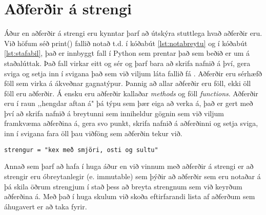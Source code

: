 \section{Aðferðir á strengi}
Áður en aðferðir á strengi eru kynntar þarf að útskýra stuttlega hvað aðferðir eru.
Við höfum séð print() fallið notað t.d. í kóðabút \ref{lst:notabreytu} og í kóðabút \ref{lst:stafabil}, það er innbyggt fall í Python sem prentar það sem beðið er um á staðalúttak. 
Það fall virkar eitt og sér og þarf bara að skrifa nafnið á því, gera sviga og setja inn í svigana það sem við viljum láta fallið fá .
Aðferðir eru sérhæfð föll sem virka á ákveðnar gagnatýpur.
Þannig að allar aðferðir eru föll, ekki öll föll eru aðferðir.
Á ensku eru aðferðir kallaðar \textit{methods} og föll \textit{functions}.
Aðferðir eru í raun ,,hengdar aftan á" þá týpu sem þær eiga að verka á, það er gert með því að skrifa nafnið á breytunni sem inniheldur gögnin sem við viljum framkvæma aðferðina á, gera svo punkt, skrifa nafnið á aðferðinni og setja sviga, inn í svigana fara öll þau viðföng sem aðferðin tekur við.

\begin{lstlisting}[caption=Aðferðir kynntar, label=lst:adferdir]
strengur = "kex með smjöri, osti og sultu"
\end{lstlisting}

Annað sem þarf að hafa í huga áður en við vinnum með aðferðir á strengi er að strengir eru óbreytanlegir (e. immutable) sem þýðir að aðferðir sem eru notaðar á þá skila öðrum strengjum í stað þess að breyta strengnum sem við keyrðum aðferðina á.
Með það í huga skulum við skoða eftirfarandi lista af aðferðum sem áhugavert er að taka fyrir.
\vspace{10px}

